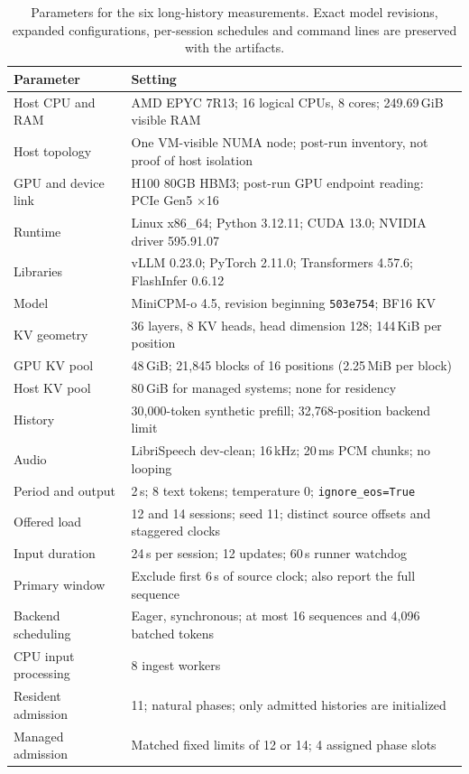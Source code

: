 \documentclass[sigplan,10pt,anonymous,review]{acmart}
\begin{document}
\begin{table}[t]
\centering
\caption{Parameters for the six long-history measurements. Exact model revisions, expanded configurations, per-session schedules and command lines are preserved with the artifacts.}
\label{tab:reproduction-settings}
\begin{tabular}{ll}
\toprule
Parameter & Setting \\
\midrule
Host CPU and RAM & AMD EPYC 7R13; 16 logical CPUs, 8 cores; 249.69\,GiB visible RAM \\
Host topology & One VM-visible NUMA node; post-run inventory, not proof of host isolation \\
GPU and device link & H100 80GB HBM3; post-run GPU endpoint reading: PCIe Gen5 $\times$16 \\
Runtime & Linux x86\_64; Python 3.12.11; CUDA 13.0; NVIDIA driver 595.91.07 \\
Libraries & vLLM 0.23.0; PyTorch 2.11.0; Transformers 4.57.6; FlashInfer 0.6.12 \\
Model & MiniCPM-o 4.5, revision beginning \texttt{503e754}; BF16 KV \\
KV geometry & 36 layers, 8 KV heads, head dimension 128; 144\,KiB per position \\
GPU KV pool & 48\,GiB; 21,845 blocks of 16 positions (2.25\,MiB per block) \\
Host KV pool & 80\,GiB for managed systems; none for residency \\
History & 30,000-token synthetic prefill; 32,768-position backend limit \\
Audio & LibriSpeech dev-clean; 16\,kHz; 20\,ms PCM chunks; no looping \\
Period and output & 2\,s; 8 text tokens; temperature 0; \texttt{ignore\_eos=True} \\
Offered load & 12 and 14 sessions; seed 11; distinct source offsets and staggered clocks \\
Input duration & 24\,s per session; 12 updates; 60\,s runner watchdog \\
Primary window & Exclude first 6\,s of source clock; also report the full sequence \\
Backend scheduling & Eager, synchronous; at most 16 sequences and 4,096 batched tokens \\
CPU input processing & 8 ingest workers \\
Resident admission & 11; natural phases; only admitted histories are initialized \\
Managed admission & Matched fixed limits of 12 or 14; 4 assigned phase slots \\

\end{tabular}
\end{table}
\end{document}
